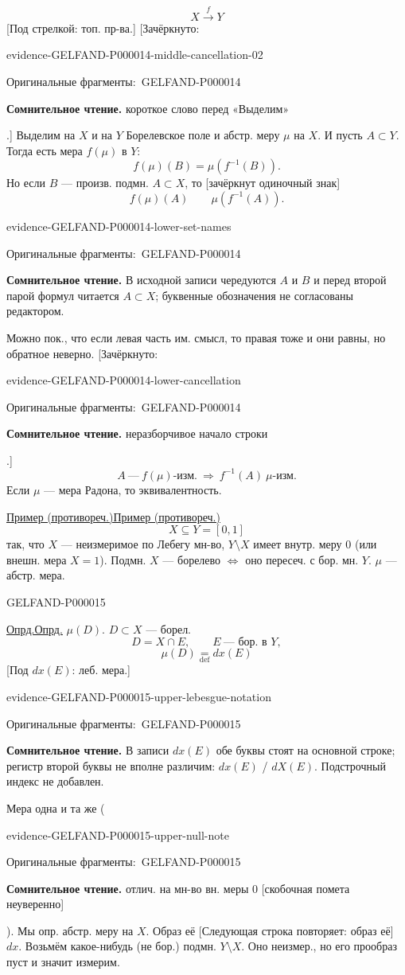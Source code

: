 \documentclass[11pt]{article}
\let\MathUnderline\underline
\renewcommand{\underline}[1]{\ifmmode\MathUnderline{#1}\else\uline{#1}\fi}
\newcommand{\SourcePage}[2]{\par\smallskip\phantomsection\label{#1:source-page}{\small\sffamily\color{blue!55!black}#1}\par\smallskip}
\newcommand{\EvidenceBlock}[4]{%
 \par\smallskip\noindent\begin{minipage}{\linewidth}
 \begin{minipage}[t]{.47\linewidth}\vspace{0pt}\centering
 \csname evidence-#1-#2\endcsname\par
 {\scriptsize\SourceCropCaption\ #1}\par
 \end{minipage}\hfill
 \begin{minipage}[t]{.49\linewidth}\vspace{0pt}\raggedright
 {\small\color{orange!65!black}\textbf{#4} #3}\par
 \end{minipage}
 \end{minipage}\par\smallskip}
\newcommand{\Unclear}[3]{\EvidenceBlock{#1}{#2}{#3}{\ReadingCaption}}
\newcommand{\SourceCropCaption}{Оригинальные фрагменты:}\newcommand{\ReadingCaption}{Сомнительное чтение.}\newcommand{\IncompleteCaption}{Неразобранный фрагмент.}\newcommand{\DiagramCaption}{Рисунок и набранное описание.}
\begin{document}
\begin{equation*}
X\overset f\longrightarrow Y
\end{equation*}
[Под стрелкой: топ. пр-ва.]
[Зачёркнуто: \Unclear{GELFAND-P000014}{middle-cancellation-02}{короткое слово перед «Выделим»}.]
Выделим на $X$ и на $Y$ Борелевское поле и абстр. меру $\mu$ на $X$.
И пусть $A\subset Y$.
Тогда есть мера $f(\mu)$ в $Y$:
\begin{equation*}
f(\mu)(B)=\mu(f^{-1}(B)).
\end{equation*}
Но если $B$ --- произв. подмн. $A\subset X$, то [зачёркнут одиночный знак]
\begin{equation*}
f(\mu)(A)\qquad \mu(f^{-1}(A)).
\end{equation*}
\Unclear{GELFAND-P000014}{lower-set-names}{В исходной записи чередуются $A$ и $B$ и перед второй парой формул читается $A\subset X$; буквенные обозначения не согласованы редактором.}
Можно пок., что если левая часть им. смысл, то правая тоже и они равны, но обратное неверно.
[Зачёркнуто: \Unclear{GELFAND-P000014}{lower-cancellation}{неразборчивое начало строки}.]
\begin{equation*}
A\ \text{---}\ f(\mu)\text{-изм.}\ \Longrightarrow\ f^{-1}(A)\ \mu\text{-изм.}
\end{equation*}
Если $\mu$ --- мера Радона, то эквивалентность.

\underline{Пример (противореч.)}
\begin{equation*}
X\subseteq Y=[0,1]
\end{equation*}
так, что $X$ --- неизмеримое по Лебегу мн-во,
$Y\setminus X$ имеет внутр. меру $0$ (или внешн. мера $X=1$).
Подмн. $X$ --- борелево $\Longleftrightarrow$ оно пересеч. с бор. мн. $Y$.
$\mu$ --- абстр. мера.



\SourcePage{GELFAND-P000015}{8}
\underline{Опрд.} $\mu(D)$.
$D\subset X$ --- борел.
\begin{equation*}
D=X\cap E,\qquad E\ \text{--- бор. в }Y,
\end{equation*}
\begin{equation*}
\mu(D)\underset{\mathrm{def}}=dx(E)
\end{equation*}
[Под $dx(E)$: леб. мера.]
\Unclear{GELFAND-P000015}{upper-lebesgue-notation}{В записи $dx(E)$ обе буквы стоят на основной строке; регистр второй буквы не вполне различим: $dx(E)$ / $dX(E)$. Подстрочный индекс не добавлен.}
Мера одна и та же (\Unclear{GELFAND-P000015}{upper-null-note}{отлич. на мн-во вн. меры 0 [скобочная помета неуверенно]}).
Мы опр. абстр. меру на $X$. Образ её
[Следующая строка повторяет: образ её] $dx$.
Возьмём какое-нибудь (не бор.) подмн. $Y\setminus X$.
Оно неизмер., но его прообраз пуст и значит измерим.
\end{document}
